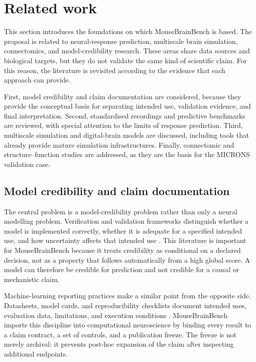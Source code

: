 \section{Related work}
\label{sec:related-work}

This section introduces the foundations on which MouseBrainBench is based. The
proposal is related to neural-response prediction, multiscale brain simulation,
connectomics, and model-credibility research. These areas share data sources and
biological targets, but they do not validate the same kind of scientific claim.
For this reason, the literature is revisited according to the evidence that each
approach can provide.

First, model credibility and claim documentation are considered, because they
provide the conceptual basis for separating intended use, validation evidence,
and final interpretation. Second, standardised recordings and predictive
benchmarks are reviewed, with special attention to the limits of response
prediction. Third, multiscale simulation and digital-brain models are discussed,
including tools that already provide mature simulation infrastructures. Finally,
connectomic and structure--function studies are addressed, as they are the basis
for the MICRONS validation case.

\subsection{Model credibility and claim documentation}
\label{subsec:model-credibility}

The central problem is a model-credibility problem rather than only a neural
modelling problem. Verification and validation frameworks distinguish whether a
model is implemented correctly, whether it is adequate for a specified intended
use, and how uncertainty affects that intended use
\citep{asme2018vv40,oberkampf2010verification,sargent2013verification,riedmaier2021vvuq}.
This literature is important for MouseBrainBench because it treats credibility as
conditional on a declared decision, not as a property that follows automatically
from a high global score. A model can therefore be credible for prediction and
not credible for a causal or mechanistic claim.

Machine-learning reporting practices make a similar point from the opposite
side. Datasheets, model cards, and reproducibility checklists document intended
uses, evaluation data, limitations, and execution conditions
\citep{gebru2021datasheets,mitchell2019modelcards,pineau2021reproducibility}.
MouseBrainBench imports this discipline into computational neuroscience by
binding every result to a claim contract, a set of controls, and a publication
freeze. The freeze is not merely archival: it prevents post-hoc expansion of the
claim after inspecting additional endpoints.

